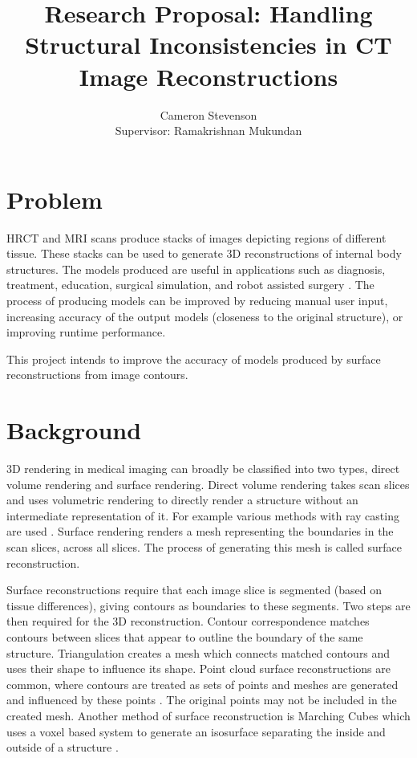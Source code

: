 \documentclass[12pt]{article}
\title{Research Proposal: Handling Structural Inconsistencies in CT Image Reconstructions}
\author{Cameron Stevenson\\[1cm]{\small Supervisor: Ramakrishnan Mukundan}}
\begin{document}
\maketitle

\section{Problem}

HRCT and MRI scans produce stacks of images depicting regions of different tissue. These stacks can be used to generate 3D reconstructions of internal body structures. The models produced are useful in applications such as diagnosis, treatment, education, surgical simulation, and robot assisted surgery \cite{mackay2019robust, mukundan2016reconstruction}. The process of producing models can be improved by reducing manual user input, increasing accuracy of the output models (closeness to the original structure), or improving runtime performance. 

This project intends to improve the accuracy of models produced by surface reconstructions from image contours.

\section{Background}

3D rendering in medical imaging can broadly be classified into two types, direct volume rendering and surface rendering. Direct volume rendering takes scan slices and uses volumetric rendering to directly render a structure without an intermediate representation of it. For example various methods with ray casting are used \cite{meyer2009voreen}. Surface rendering renders a mesh representing the boundaries in the scan slices, across all slices. The process of generating this mesh is called surface reconstruction. 

Surface reconstructions require that each image slice is segmented (based on tissue differences), giving contours as boundaries to these segments. Two steps are then required for the 3D reconstruction. Contour correspondence matches contours between slices that appear to outline the boundary of the same structure. Triangulation creates a mesh which connects matched contours and uses their shape to influence its shape. Point cloud surface reconstructions are common, where contours are treated as sets of points and meshes are generated and influenced by these points \cite{berger2017survey}. The original points may not be included in the created mesh. Another method of surface reconstruction is Marching Cubes which uses a voxel based system to generate an isosurface separating the inside and outside of a structure \cite{newman2006survey}.
\end{document}
